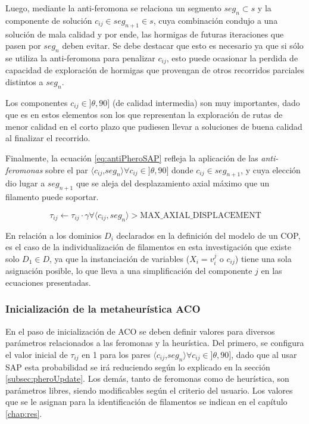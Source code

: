 Luego, mediante la anti-feromona se relaciona un segmento $seg_n \subset s$ y la componente de soluci\'on $c_{ij} \in seg_{n+1} \in s$, cuya combinaci\'on condujo a una soluci\'on de mala calidad y por ende, las hormigas de futuras iteraciones que pasen por $seg_n$ deben evitar. Se debe destacar que esto es necesario ya que si s\'olo se utiliza la anti-feromona para penalizar $c_{ij}$, esto puede ocasionar la perdida de capacidad de exploraci\'on de hormigas que provengan de otros recorridos parciales distintos a $seg_n$. 


Los componentes $c_{ij} \in ]\theta, 90]$ (de calidad intermedia) son muy importantes, dado que es en estos elementos son los que representan la exploraci\'on de rutas de menor calidad en el corto plazo que pudiesen llevar a soluciones de buena calidad al finalizar el recorrido.


Finalmente, la ecuaci\'on \eqref{eq:antiPheroSAP} refleja la aplicaci\'on de las {\it anti-feromonas} sobre el par $\langle c_{ij}$,$ seg_{n}\rangle \forall c_{ij} \in ]\theta, 90]$  donde $c_{ij} \in seg_{n+1}$, y cuya elecci\'on dio lugar a $seg_{n+1}$ que se aleja del desplazamiento axial m\'aximo que un filamento puede soportar.

\begin{equation}
    \label{eq:antiPheroSAP}
    \tau_{ij} \leftarrow \tau_{ij} \cdot \gamma  \forall \langle c_{ij},seg_{n}\rangle > \textrm{MAX\_AXIAL\_DISPLACEMENT}
\end{equation}

En relaci\'on a los dominios $D_i$ declarados en la definici\'on del modelo de un COP, es el caso de la individualizaci\'on de filamentos en esta investigaci\'on que existe solo $D_1 \in D$, ya que la instanciaci\'on de variables ($X_i = v_{i}^{j}$ o $c_{ij}$) tiene una sola asignaci\'on posible, lo que lleva a una simplificaci\'on del componente $j$ en las ecuaciones presentadas.

\subsubsection{Inicializaci\'on de la metaheur\'istica ACO}

En el paso de inicializaci\'on de ACO se deben definir valores para diversos par\'ametros relacionados a las feromonas y la heur\'istica. Del primero, se configura el valor inicial de $\tau_{ij}$ en 1 para los pares $\langle c_{ij}$,$ seg_{n}\rangle \forall c_{ij} \in ]\theta, 90]$, dado que al usar SAP esta probabilidad se ir\'a reduciendo seg\'un lo explicado en la secci\'on \ref{subsec:pheroUpdate}. Los dem\'as, tanto de feromonas como de heur\'istica, son par\'ametros libres, siendo modificables seg\'un el criterio del usuario. Los valores que se le asignan para la identificaci\'on de filamentos se indican en el cap\'itulo \ref{chap:res}.

